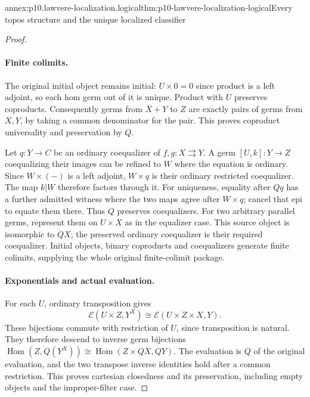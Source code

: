 \begin{annexitem}{annex:p10.lawvere-localization.logical}{thm:p10-lawvere-localization-logical}{Every topos structure and the unique localized classifier}
\begin{proof}
\paragraph{Finite colimits.}
The original initial object remains initial:
\(U\times0=0\) since product is a left
adjoint, so each hom germ out of it is unique.
Product with \(U\) preserves coproducts.
Consequently germs from \(X+Y\) to \(Z\)
are exactly pairs of germs from \(X,Y\),
by taking a common denominator for the pair.
This proves coproduct universality and
preservation by \(Q\).

Let \(q:Y\to C\) be an ordinary coequalizer
of \(f,g:X\rightrightarrows Y\).  A germ
\([U,k]:Y\to Z\) coequalizing their images
can be refined to \(W\) where the equation
is ordinary.  Since \(W\times(-)\) is a
left adjoint, \(W\times q\) is their
ordinary restricted coequalizer.  The map
\(k|W\) therefore factors through it.
For uniqueness, equality after \(Qq\)
has a further admitted witness where the
two maps agree after \(W\times q\);
cancel that epi to equate them there.
Thus \(Q\) preserves coequalizers.
For two arbitrary parallel germs, represent
them on \(U\times X\) as in the equalizer
case.  This source object is isomorphic to
\(QX\); the preserved ordinary coequalizer
is their required coequalizer.  Initial
objects, binary coproducts and coequalizers
generate finite colimits, supplying the
whole original finite-colimit package.

\paragraph{Exponentials and actual evaluation.}
For each \(U\), ordinary transposition gives
\[
 \mathcal E(U\times Z,Y^X)
       \cong\mathcal E(U\times Z\times X,Y).
\]
These bijections commute with restriction
of \(U\), since transposition is natural.
They therefore descend to inverse germ
bijections
\(\operatorname{Hom}(Z,Q(Y^X))\cong
\operatorname{Hom}(Z\times QX,QY)\).
The evaluation is \(Q\) of the original
evaluation, and the two transpose inverse
identities hold after a common restriction.
This proves cartesian closedness and its
preservation, including empty objects and
the improper-filter case.


\end{proof}
\end{annexitem}
